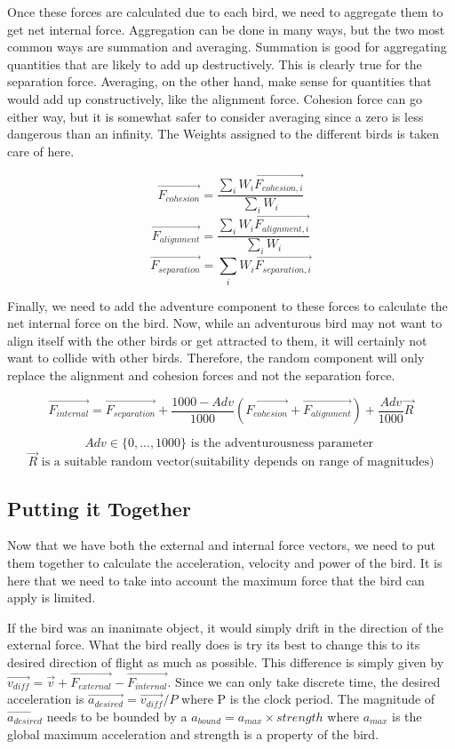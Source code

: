 \documentclass{article}
\begin{document}
Once these forces are calculated due to each bird, we need to aggregate them to get net internal force. Aggregation can be done in many ways, but the two most common ways are summation and averaging. Summation is good for aggregating quantities that are likely to add up destructively. This is clearly true for the separation force. Averaging, on the other hand, make sense for quantities that would add up constructively, like the alignment force. Cohesion force can go either way, but it is somewhat safer to consider averaging since a zero is less dangerous than an infinity. The Weights assigned to the different birds is taken care of here.

\begin{center}
    $$\vec{F_{cohesion}}=\frac{\sum_iW_i\vec{F_{cohesion,i}}}{\sum_iW_i}$$
    $$\vec{F_{alignment}}=\frac{\sum_iW_i\vec{F_{alignment,i}}}{\sum_iW_i}$$
     $$\vec{F_{separation}}=\sum_iW_i\vec{F_{separation,i}}$$
\end{center}

Finally, we need to add the adventure component to these forces to calculate the net internal force on the bird. Now, while an adventurous bird may not want to align itself with the other birds or get attracted to them, it will certainly not want to collide with other birds. Therefore, the random component will only replace the alignment and cohesion forces and not the separation force.
\begin{center}
    $$\vec{F_{internal}}=\vec{F_{separation}}+\frac{1000-Adv}{1000}(\vec{F_{cohesion}}+ \vec{F_{alignment}})+\frac{Adv}{1000}\vec{R}$$
    
    $$Adv \in \{0,...,1000\} \text{ is the adventurousness parameter }$$
    $$\vec{R} \text{ is a suitable random vector(suitability depends on range of magnitudes)}$$
\end{center}
\subsection{Putting it Together}
Now that we have both the external and internal force vectors, we need to put them together to calculate the acceleration, velocity and power of the bird. It is here that we need to take into account the maximum force that the bird can apply is limited.

If the bird was an inanimate object, it would simply drift in the direction of the external force. What the bird really does is try its best to change this to its desired direction of flight as much as possible. This difference is simply given by $\vec{v_{diff}}=\vec{v}+\vec{F_{external}}-\vec{F_{internal}}$. Since we can only take discrete time, the desired acceleration is $\vec{a_{desired}}=\vec{v_{diff}}/P$ where P is the clock period. The magnitude of  $\vec{a_{desired}}$ needs to be bounded by a $a_{bound}=a_{max} \times strength$ where $a_{max}$ is the global maximum acceleration and strength is a property of the bird.\newline
\end{document}
